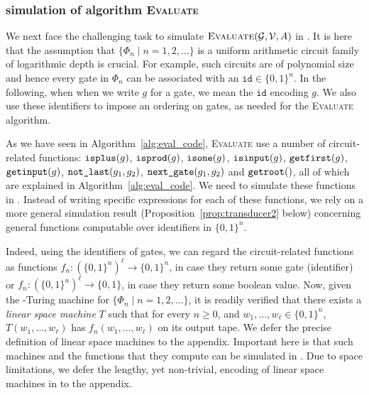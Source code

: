  




\subsubsection{\langfor simulation of algorithm {\normalfont \textsc{Evaluate}}}\label{subsubsec:simulate}
We next face the challenging task to simulate $\textsc{Evaluate}(\mathcal{G},\mathcal{V},A)$ in \langfor. It is here that the
assumption that  $\{\Phi_n\mid n=1,2,\ldots\}$ is a uniform arithmetic circuit family of logarithmic depth is crucial.
For example, such circuits are of polynomial size and hence every gate in $\Phi_n$ can be associated with an $\texttt{id}\in\lbrace 0,1 \rbrace^n$. In the following, when when we write $g$ for a gate, we mean the $\texttt{id}$ encoding $g$. We also use these identifiers to impose an
ordering on gates, as needed for the \textsc{Evaluate} algorithm. 


As we have seen in Algorithm~\ref{alg:eval_code}, \textsc{Evaluate} use a number of circuit-related functions:
$\texttt{isplus}(g)$, $\texttt{isprod}(g)$, $\texttt{isone}(g)$, $\texttt{isinput}(g)$, $\texttt{getfirst}(g)$, $\texttt{getinput}(g)$, $\texttt{not{\_}last}(g_1,g_2)$,
\allowbreak $\texttt{next{\_}gate}(g_1, g_2)$ and $\texttt{getroot}()$, all of which are explained in Algorithm~\ref{alg:eval_code}. 
We need to simulate these functions in \langfor. Instead of writing specific \langfor expressions for each of these
functions, we rely on a more general simulation result (Proposition~\ref{prop:transducer2} below) concerning general
functions computable over identifiers in $\{0,1\}^n$.

Indeed, using the identifiers of gates, we can regard the circuit-related functions as functions $f_n:(\lbrace 0,1 \rbrace^{n})^\ell\rightarrow\lbrace 0,1 \rbrace^n$, in case they return some gate (identifier) or $f_n:(\lbrace 0,1 \rbrace^{n})^\ell\rightarrow\lbrace 0,1 \rbrace$,
in case they return some boolean value. Now, given the \logspace-Turing machine for $\{\Phi_n\mid n=1,2,\ldots\}$, it is readily verified that there exists a \textit{linear
space machine} $T$ such that for every $n\geq 0$, and $w_1,\ldots,w_\ell\in\{0,1\}^n$, $T(w_1,\ldots,w_\ell)$ has $f_n(w_1,\ldots,w_\ell)$ on its output tape. We defer the precise definition of linear space machines to the appendix.
Important here is that such machines and the functions that they compute  can be simulated in \langfor. Due to space limitations, we defer the lengthy, yet non-trivial, encoding of linear space machines in \langfor to the appendix.

